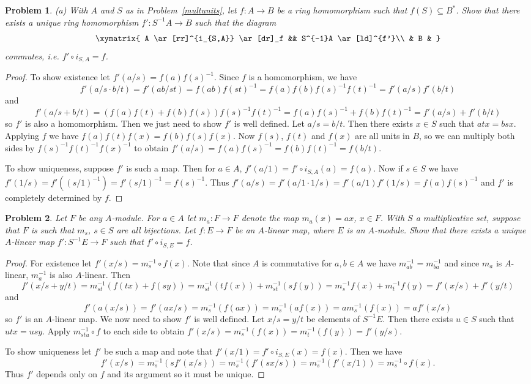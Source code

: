 \documentclass{article}
\newtheorem{problem}{Problem}
\begin{document}
\begin{problem}
(a) With $A$ and $S$ as in Problem~\ref{multunits}, let $f : A \to B$ be a ring homomorphism such that $f(S) \subseteq B^*$. Show that there exists a unique ring homomorphism $f' : S^{-1}A \to B$ such that the diagram
\[
\xymatrix{
A \ar[rr]^{i_{S,A}} \ar[dr]_f && S^{-1}A \ar[ld]^{f'}\\
& B &
}
\]
commutes, i.e. $f' \circ i_{S,A} = f$.
\end{problem}
\begin{proof}
To show existence let $f'(a/s) = f(a)f(s)^{-1}$. Since $f$ is a homomorphism, we have
\[
f'(a/s \cdot b/t) = f'(ab/st) = f(ab)f(st)^{-1} = f(a)f(b)f(s)^{-1}f(t)^{-1} = f'(a/s)f'(b/t)
\]
and
\[
f'(a/s + b/t) = (f(a)f(t) + f(b)f(s))f(s)^{-1}f(t)^{-1} = f(a)f(s)^{-1} + f(b)f(t)^{-1} = f'(a/s) + f'(b/t)
\]
so $f'$ is also a homomorphism. Then we just need to show $f'$ is well defined. Let $a/s = b/t$. Then there exists $x \in S$ such that $atx = bsx$. Applying $f$ we have $f(a)f(t)f(x) = f(b)f(s)f(x)$. Now $f(s)$, $f(t)$ and $f(x)$ are all units in $B$, so we can multiply both sides by $f(s)^{-1}f(t)^{-1}f(x)^{-1}$ to obtain $f'(a/s) = f(a)f(s)^{-1} = f(b)f(t)^{-1} = f(b/t)$.

To show uniqueness, suppose $f'$ is such a map. Then for $a \in A$, $f'(a/1) = f' \circ i_{S,A}(a) = f(a)$. Now if $s \in S$ we have $f'(1/s) = f'((s/1)^{-1}) = f'(s/1)^{-1} = f(s)^{-1}$. Thus $f'(a/s) = f'(a/1 \cdot 1/s) = f'(a/1) f'(1/s) = f(a)f(s)^{-1}$ and $f'$ is completely determined by $f$.
\end{proof}

\begin{problem}
Let $F$ be any $A$-module. For $a \in A$ let $m_a : F \to F$ denote the map $m_a(x) = ax$, $x \in F$. With $S$ a multiplicative set, suppose that $F$ is such that $m_s$, $s \in S$ are all bijections. Let $f : E \to F$ be an $A$-linear map, where $E$ is an $A$-module. Show that there exists a unique $A$-linear map $f' : S^{-1}E \to F$ such that $f' \circ i_{S,E} = f$.
\end{problem}
\begin{proof}
For existence let $f'(x/s) = m_s^{-1} \circ f(x)$. Note that since $A$ is commutative for $a,b \in A$ we have $m_{ab}^{-1} = m_{ba}^{-1}$ and since $m_a$ is $A$-linear, $m_a^{-1}$ is also $A$-linear. Then
\[
f'(x/s + y/t) = m_{st}^{-1}(f(tx) + f(sy)) = m_{st}^{-1}(tf(x)) + m_{st}^{-1}(sf(y)) = m_s^{-1}f(x) + m_t^{-1}f(y) = f'(x/s) + f'(y/t)
\]
and
\[
f'(a(x/s)) = f'(ax/s) = m_s^{-1}(f(ax)) = m_s^{-1}(af(x)) = am_s^{-1}(f(x)) = af'(x/s)
\]
so $f'$ is an $A$-linear map. We now need to show $f'$ is well defined. Let $x/s = y/t$ be elements of $S^{-1}E$. Then there exists $u \in S$ such that $utx = usy$. Apply $m_{stu}^{-1} \circ f$ to each side to obtain $f'(x/s) = m_s^{-1}(f(x)) = m_t^{-1}(f(y)) = f'(y/s)$.

To show uniqueness let $f'$ be such a map and note that $f'(x/1) = f' \circ i_{S,E}(x) = f(x)$. Then we have
\[
f'(x/s) = m_s^{-1}(sf'(x/s)) = m_s^{-1}(f'(sx/s)) = m_s^{-1}(f'(x/1)) = m_s^{-1} \circ f(x).
\]
Thus $f'$ depends only on $f$ and its argument so it must be unique.
\end{proof}
\end{document}
